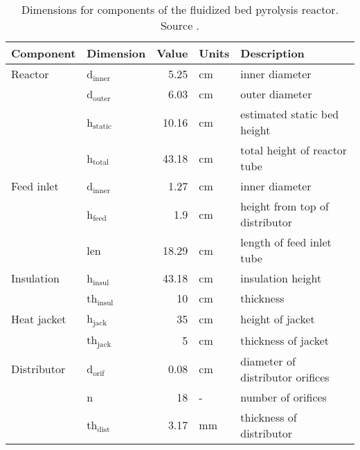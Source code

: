 \begin{table}[H]
    \centering
    \caption{Dimensions for components of the fluidized bed pyrolysis reactor. Source \cite{French-2019}.}
    \label{tab:dimensions}
    \begin{tabular}{llrll}
        \toprule
        Component & Dimension & Value & Units & Description \\
        \midrule
        Reactor
            & d$_\textrm{inner}$ & 5.25 & cm & inner diameter \\
            & d$_\textrm{outer}$ & 6.03 & cm & outer diameter \\
            & h$_\textrm{static}$ & 10.16 & cm & estimated static bed height \\
            & h$_\textrm{total}$ & 43.18 & cm & total height of reactor tube \\
        Feed inlet
            & d$_\textrm{inner}$ & 1.27 & cm & inner diameter \\
            & h$_\textrm{feed}$ & 1.9 & cm & height from top of distributor \\
            & len & 18.29 & cm & length of feed inlet tube \\
        Insulation
            & h$_\textrm{insul}$ & 43.18 & cm & insulation height \\
            & th$_\textrm{insul}$ & 10 & cm & thickness \\
        Heat jacket
            & h$_\textrm{jack}$ & 35 & cm & height of jacket \\
            & th$_\textrm{jack}$ & 5 & cm & thickness of jacket \\
        Distributor
            & d$_\textrm{orif}$ & 0.08 & cm & diameter of distributor orifices \\
            & n & 18 & - & number of orifices \\
            & th$_\textrm{dist}$ & 3.17 & mm & thickness of distributor \\
        \bottomrule
    \end{tabular}
\end{table}

